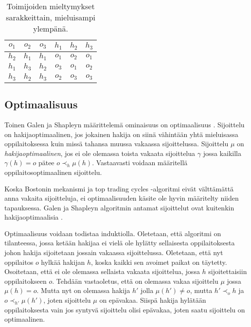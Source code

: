 \documentclass[twoside]{tktltiki}
\begin{document}
\begin{table}[b]
  \begin{center}
    \begin{tabular}{ c c c | c c c }
    $o_1$ & $o_2$ & $o_3$ & $h_1$ & $h_2$ & $h_3$ \\
    \hline
    $h_2$ & $h_1$ & $h_1$ & $o_1$ & $o_2$ & $o_1$ \\
    $h_1$ & $h_3$ & $h_2$ & $o_3$ & $o_1$ & $o_2$ \\
    $h_3$ & $h_2$ & $h_3$ & $o_2$ & $o_3$ & $o_3$
    \end{tabular}
    \caption{Toimijoiden mieltymykset sarakkeittain, mieluisampi ylempänä.}
    \label{boston_vakaus}
  \end{center}
\end{table}

\subsection{Optimaalisuus}

Toinen Galen ja Shapleyn määrittelemä ominaisuus on optimaalisuus
\cite{galeshapley62}. Sijoittelu on hakijaoptimaalinen, jos jokainen
hakija on siinä vähintään yhtä mieluisassa oppilaitoksessa kuin missä
tahansa muussa vakaassa sijoittelussa. Sijoittelu $\mu$ on
\emph{hakijaoptimaalinen}, jos ei ole olemassa toista vakaata
sijoittelua $\gamma$ jossa kaikilla $\gamma(h) = o$ pätee $o \prec_h
\mu(h)$. Vastaavasti voidaan määritellä oppilaitosoptimaalinen
sijoittelu.

Koska Bostonin mekanismi ja top trading cycles -algoritmi eivät
välttämättä anna vakaita sijoitteluja, ei optimaalisuuden käsite ole
hyvin määritelty niiden tapauksessa. Galen ja Shapleyn algoritmin
antamat sijoittelut ovat kuitenkin hakijaoptimaalisia
\cite{galeshapley62}.

Optimaalisuus voidaan todistaa induktiolla. Oletetaan, että algoritmi
on tilanteessa, jossa ketään hakijaa ei vielä ole hylätty sellaisesta
oppilaitoksesta johon hakija sijoitetaan jossain vakaassa
sijoittelussa. Oletetaan, että nyt oppilaitos $o$ hylkää hakijan $h$,
koska kaikki sen avoimet paikat on täytetty. Osoitetaan, että ei ole
olemassa sellaista vakaata sijoittelua, jossa $h$ sijoitettaisiin
oppilaitokseen $o$. Tehdään vastaoletus, että on olemassa vakaa
sijoittelu $\mu$ jossa $\mu(h) = o$. Mutta nyt on olemassa hakija $h'$
jolla $\mu(h') \neq o$, mutta $h' \prec_o h$ ja $o \prec_{h'}
\mu(h')$, joten sijoittelu $\mu$ on epävakaa. Siispä hakija hylätään
oppilaitoksesta vain jos syntyvä sijoittelu olisi epävakaa, joten
saatu sijoittelu on optimaalinen.
\end{document}
